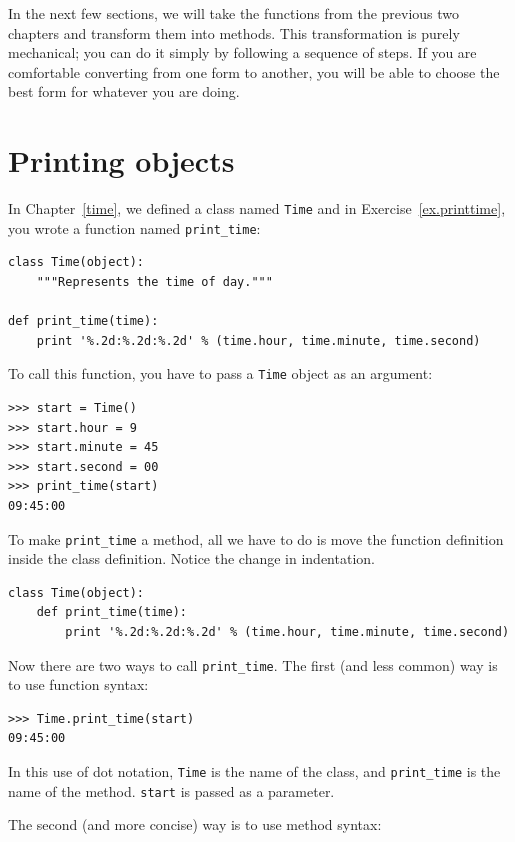 \documentclass[10pt]{book}
\begin{document}
\begin{CJK}{UTF8}{gbsn}
\begin{itemize}
\end{itemize}

In the next few sections, we will take the functions from the previous
two chapters and transform them into methods.  This transformation is
purely mechanical; you can do it simply by following a sequence of
steps.  If you are comfortable converting from one form to another,
you will be able to choose the best form for whatever you are doing.


\section{Printing objects}

In Chapter~\ref{time}, we defined a class named
{\tt Time} and in Exercise~\ref{ex.printtime}, you 
wrote a function named \verb"print_time":

\begin{verbatim}
class Time(object):
    """Represents the time of day."""

def print_time(time):
    print '%.2d:%.2d:%.2d' % (time.hour, time.minute, time.second)
\end{verbatim}
%
To call this function, you have to pass a {\tt Time} object as an
argument:

\begin{verbatim}
>>> start = Time()
>>> start.hour = 9
>>> start.minute = 45
>>> start.second = 00
>>> print_time(start)
09:45:00
\end{verbatim}
%
To make \verb"print_time" a method, all we have to do is
move the function definition inside the class definition.  Notice
the change in indentation.

\begin{verbatim}
class Time(object):
    def print_time(time):
        print '%.2d:%.2d:%.2d' % (time.hour, time.minute, time.second)
\end{verbatim}
%
Now there are two ways to call \verb"print_time".  The first
(and less common) way is to use function syntax:


\begin{verbatim}
>>> Time.print_time(start)
09:45:00
\end{verbatim}
%
In this use of dot notation, {\tt Time} is the name of the class,
and \verb"print_time" is the name of the method.  {\tt start} is
passed as a parameter.

The second (and more concise) way is to use method syntax:


\end{CJK}
\end{document}
